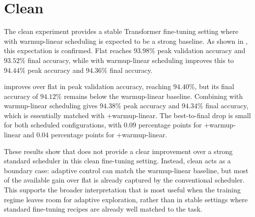 \section{Clean \agnews{}}
\label{sec:results-agnews-clean}



The clean \agnews{} experiment provides a stable Transformer fine-tuning setting where \adamw{} with warmup-linear scheduling is expected to be a strong baseline. As shown in , this expectation is confirmed. Flat \adamw{} reaches $93.98\%$ peak validation accuracy and $93.52\%$ final accuracy, while \adamw{} with warmup-linear scheduling improves this to $94.44\%$ peak accuracy and $94.36\%$ final accuracy.

\method{} improves over flat \adamw{} in peak validation accuracy, reaching $94.40\%$, but its final accuracy of $94.12\%$ remains below the warmup-linear baseline. Combining \method{} with warmup-linear scheduling gives $94.38\%$ peak accuracy and $94.34\%$ final accuracy, which is essentially matched with \adamw{}+warmup-linear. The best-to-final drop is small for both scheduled configurations, with $0.09$ percentage points for \adamw{}+warmup-linear and $0.04$ percentage points for \method{}+warmup-linear.

These results show that \method{} does not provide a clear improvement over a strong standard scheduler in this clean fine-tuning setting. Instead, clean \agnews{} acts as a boundary case: adaptive control can match the warmup-linear baseline, but most of the available gain over flat \adamw{} is already captured by the conventional scheduler. This supports the broader interpretation that \method{} is most useful when the training regime leaves room for adaptive exploration, rather than in stable settings where standard fine-tuning recipes are already well matched to the task.